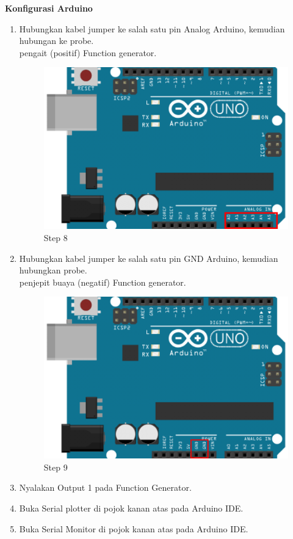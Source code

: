 \begin{center}
	\textbf{Konfigurasi Arduino}
	\begin{enumerate}
		\item Hubungkan kabel jumper ke salah satu pin Analog Arduino, kemudian hubungan ke probe.
		\\pengait (positif) Function generator.
		\begin{figure}[H]
			\centering
			\includegraphics[width=0.8\linewidth]{P5/img/per1/step 8.png}
			\caption{Step 8}
			\label{fig:Step 8(Step 8)}
		\end{figure}

		\item Hubungkan kabel jumper ke salah satu pin GND Arduino, kemudian hubungkan probe.
		\\penjepit buaya (negatif) Function generator.
		\begin{figure}[H]
			\centering
			\includegraphics[width=0.8\linewidth]{P5/img/per1/step 9.png}
			\caption{Step 9}
			\label{fig:Step 9(Step 9)}
		\end{figure}

		\item Nyalakan Output 1 pada Function Generator.
		\item Buka Serial plotter di pojok kanan atas pada Arduino IDE.
		\item Buka Serial Monitor di pojok kanan atas pada Arduino IDE.
	\end{enumerate}

\end{center}

